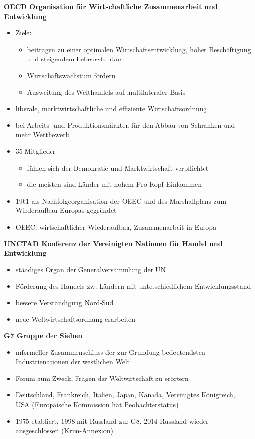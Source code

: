 \vspace{\baselineskip}
\textbf{OECD Organisation für Wirtschaftliche Zusammenarbeit und Entwicklung}
\begin{itemize}
	\item Ziele:
	\begin{itemize}
		\item beitragen zu einer optimalen Wirtschaftsentwicklung, hoher Beschäftigung und steigendem Lebensstandard
		\item Wirtschaftswachstum fördern
		\item Ausweitung des Welthandels auf multilateraler Basis
	\end{itemize}
	\item liberale, marktwirtschaftliche und effiziente Wirtschaftsordnung
	\item bei Arbeits- und Produktionsmärkten für den Abbau von Schranken und mehr Wettbewerb
	\item 35 Mitglieder
	\begin{itemize}
			\item fühlen sich der Demokratie und Marktwirtschaft verpflichtet 
			\item die meisten sind Länder mit hohem Pro-Kopf-Einkommen
	\end{itemize}
	\item 1961 als Nachfolgeorganisation der OEEC und des Marshallplans zum Wiederaufbau Europas gegründet
	\item OEEC: wirtschaftlicher Wiederaufbau, Zusammenarbeit in Europa
\end{itemize}
\vspace{\baselineskip}
\textbf{UNCTAD Konferenz der Vereinigten Nationen für Handel und Entwicklung}
\begin{itemize}
	\item ständiges Organ der Generalversammlung der UN
	\item Förderung des Handels zw. Ländern mit unterschiedlichem Entwicklungsstand
	\item bessere Verständigung Nord-Süd
	\item neue Weltwirtschaftsordnung erarbeiten
\end{itemize}
\vspace{\baselineskip}
\textbf{G7 Gruppe der Sieben}
\begin{itemize}
	\item informeller Zusammenschluss der zur Gründung bedeutendsten Industrienationen der westlichen Welt
	\item Forum zum Zweck, Fragen der Weltwirtschaft zu erörtern
	\item Deutschland, Frankreich, Italien, Japan, Kanada, Vereinigtes Königreich, USA (Europäische Kommission hat Beobachterstatus)
	\item 1975 etabliert, 1998 mit Russland zur G8, 2014 Russland wieder ausgeschlossen (Krim-Annexion)
\end{itemize}
